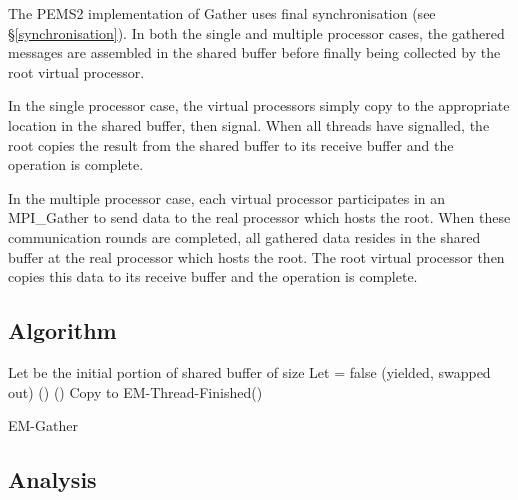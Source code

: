 \documentclass[12pt]{carletoncsthesis}
\begin{document}
The PEMS2 implementation of Gather uses final synchronisation (see
\S\ref{synchronisation}).  In both the single and multiple processor cases,
the gathered messages are assembled in the shared buffer before finally
being collected by the root virtual processor.

In the single processor case, the virtual processors simply copy to the
appropriate location in the shared buffer, then signal.  When all threads
have signalled, the root copies the result from the shared buffer to its
receive buffer and the operation is complete.

In the multiple processor case, each virtual processor participates in an
{\sc MPI\_Gather} to send data to the real processor which hosts the root.
When these communication rounds are completed, all gathered data resides
in the shared buffer at the real processor which hosts the root.  The root
virtual processor then copies this data to its receive buffer and the
operation is complete.


\subsection{Algorithm}


\begin{algorithm}
\BlankLine
Let  be the initial portion of shared buffer of size \;
Let  = false (yielded, swapped out)\;
\Else(){
	\Else(){
		Copy  to \;
		{\sc EM-Thread-Finished()}\;
	}
}
\BlankLine{}\BlankLine
\caption{{\sc EM-Gather}}
\label{gather-alg}
\end{algorithm}


\clearpage
\subsection{Analysis}
\end{document}

